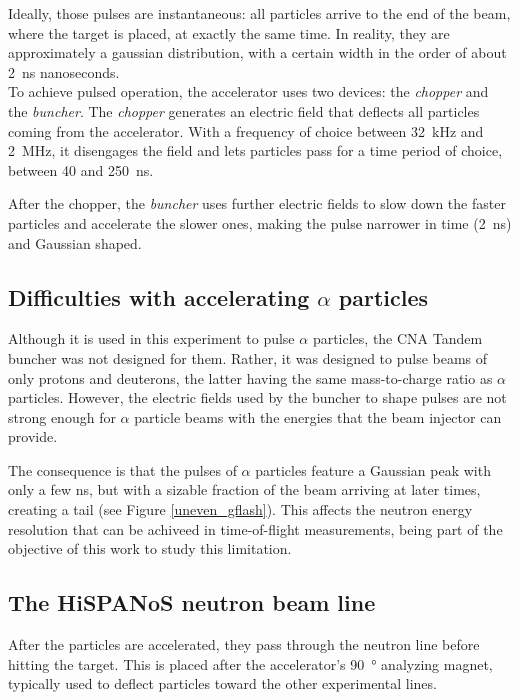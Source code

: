 \documentclass[a4paper,12pt]{report}
\begin{document}
Ideally, those pulses are instantaneous: all particles arrive to the end of the beam, where the target is placed, at exactly the same time.
In reality, they are approximately a gaussian distribution, with a certain width in the order of about \qty{2}{\nano\second} nanoseconds.
\\

To achieve pulsed operation, the accelerator uses two devices: the \textit{chopper} and the \textit{buncher}.
The \textit{chopper} generates an electric field that deflects all particles coming from the accelerator.
With a frequency of choice between \qty{32}{\kilo\Hz} and \qty{2}{\mega\Hz}, it disengages the field and lets particles pass for a time period of choice, between 40 and \qty{250}{\nano\second}.

After the chopper, the \textit{buncher} uses further electric fields to slow down the faster particles and accelerate the slower ones, making the pulse narrower in time (\qty{2}{\nano\second}) and Gaussian shaped.
\\

\subsection{Difficulties with accelerating $\alpha$ particles}
Although it is used in this experiment to pulse $\alpha$ particles, the CNA Tandem buncher was not designed for them.
Rather, it was designed to pulse beams of only protons and deuterons, the latter having the same mass-to-charge ratio as $\alpha$ particles.
However, the electric fields used by the buncher to shape pulses are not strong enough for $\alpha$ particle beams with the energies that the beam injector can provide.

The consequence is that the pulses of $\alpha$ particles feature a Gaussian peak with only a few \unit{\nano\second}, but with a sizable fraction of the beam arriving at later times, creating a tail (see Figure \ref{uneven_gflash}).
This affects the neutron energy resolution that can be achiveed in time-of-flight measurements, being part of the objective of this work to study this limitation.
\\

\subsection{The HiSPANoS neutron beam line}
After the particles are accelerated, they pass through the neutron line before hitting the target.
This is placed after the accelerator's \qty{90}{\degree} analyzing magnet, typically used to deflect particles toward the other experimental lines.
\end{document}
